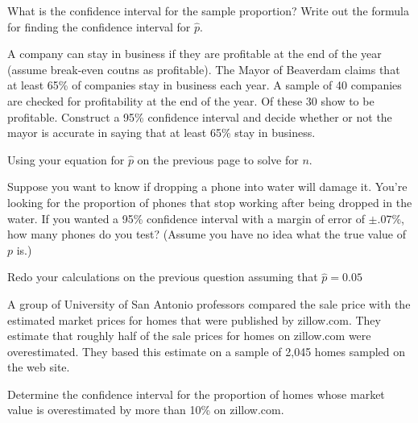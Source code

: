 
\begin{problem}
\item What is the confidence interval for the sample proportion? Write
  out the formula for finding the confidence interval for $\hat{p}$.
  \vspace{3em}

  \item A company can stay in business if they are profitable at the
    end of the year (assume break-even coutns as profitable). The
    Mayor of Beaverdam claims that at least 65\% of companies stay in
    business each year. A sample of 40 companies are checked for
    profitability at the end of the year. Of these 30 show to be
    profitable. Construct a 95\% confidence interval and decide
    whether or not the mayor is accurate in saying that at least 65\%
    stay in business.

    \vfill

    \clearpage

  \item Using your equation for $\hat{p}$ on the previous page to solve for $n$.

    \vfill

  \item Suppose you want to know if dropping a phone into water will
    damage it. You're looking for the proportion of phones that stop
    working after being dropped in the water. If you wanted a 95\%
    confidence interval with a margin of error of $\pm .07\%$, how
    many phones do you test? (Assume you have no idea what the true
    value of $p$ is.)

    \vfill

  \item Redo your calculations on the previous question assuming that
    $\hat{p}=0.05$

    \vfill
    \vfill


    \clearpage

  \item A group of University of San Antonio professors compared the
    sale price with the estimated market prices for homes that were
    published by zillow.com. They estimate that roughly half of the
    sale prices for homes on zillow.com were overestimated. They based
    this estimate on a sample of 2,045 homes sampled on the web site.

    \begin{subproblem}
    \item Determine the confidence interval for the proportion of homes
      whose market value is overestimated by more than 10\% on
      zillow.com. 


\end{subproblem}
\end{problem}
